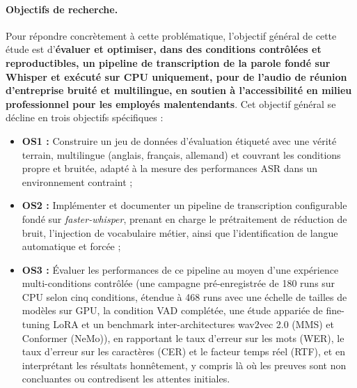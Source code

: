 \documentclass[12pt]{report}
\begin{document}
\paragraph{Objectifs de recherche.}
Pour répondre concrètement à cette problématique, l'objectif général de cette étude est d'\textbf{évaluer et optimiser, dans des conditions contrôlées et reproductibles, un pipeline de transcription de la parole fondé sur Whisper et exécuté sur CPU uniquement, pour de l'audio de réunion d'entreprise bruité et multilingue, en soutien à l'accessibilité en milieu professionnel pour les employés malentendants}. Cet objectif général se décline en trois objectifs spécifiques :
\begin{itemize}
    \item \textbf{OS1 :} Construire un jeu de données d'évaluation étiqueté avec une vérité terrain, multilingue (anglais, français, allemand) et couvrant les conditions propre et bruitée, adapté à la mesure des performances ASR dans un environnement contraint ;
    \item \textbf{OS2 :} Implémenter et documenter un pipeline de transcription configurable fondé sur \textit{faster-whisper}, prenant en charge le prétraitement de réduction de bruit, l'injection de vocabulaire métier, ainsi que l'identification de langue automatique et forcée ;
    \item \textbf{OS3 :} Évaluer les performances de ce pipeline au moyen d'une expérience multi-conditions contrôlée (une campagne pré-enregistrée de 180 runs sur CPU selon cinq conditions, étendue à 468 runs avec une échelle de tailles de modèles sur GPU, la condition VAD complétée, une étude appariée de fine-tuning LoRA et un benchmark inter-architectures wav2vec 2.0 (MMS) et Conformer (NeMo)), en rapportant le taux d'erreur sur les mots (WER), le taux d'erreur sur les caractères (CER) et le facteur temps réel (RTF), et en interprétant les résultats honnêtement, y compris là où les preuves sont non concluantes ou contredisent les attentes initiales.
\end{itemize}
\end{document}
